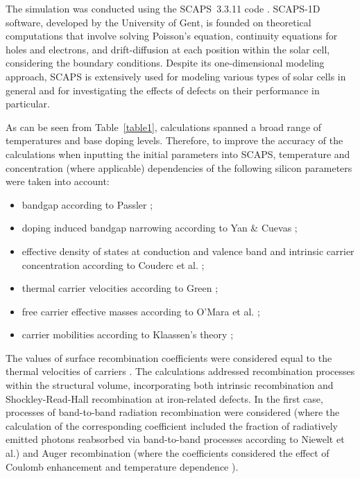 \documentclass[a4paper,fleqn]{cas-sc}
\begin{document}
The simulation was conducted using the SCAPS~3.3.11 code \cite{SCAPS1}.
SCAPS-1D software, developed by the University of Gent, is founded on theoretical computations that involve solving Poisson's equation,
continuity equations for holes and electrons, and drift-diffusion at each position within the solar cell,
considering the boundary conditions.
Despite its one-dimensional modeling approach, SCAPS is extensively used for modeling various types of solar cells \cite{Joshi2024,Ravidas2024,Liu2024,You2023} in general
and for investigating the effects of defects on their performance \cite{AitAbdelkadir2023,Liang2024,SCAPSDefect3} in particular.


As can be seen from Table~\ref{table1}, calculations spanned a broad range of temperatures and base doping levels.
Therefore, to improve the accuracy of the calculations when inputting the initial parameters into SCAPS,
temperature and concentration (where applicable) dependencies of the following silicon parameters were taken into account:

\begin{itemize}
    \item bandgap according to Passler \cite{Passler2002};
    \item doping induced bandgap narrowing according to Yan \& Cuevas \cite{EgNarrow};
    \item effective density of states at conduction and valence band and intrinsic carrier concentration according to Couderc et al. \cite{Si_ni_Couderc};
    \item thermal carrier velocities according to Green \cite{Nc:Green};
    \item free carrier effective masses according to O’Mara et al. \cite{OMara};
    \item carrier mobilities according to Klaassen's theory \cite{KLAASSEN953};
\end{itemize}

The values of surface recombination coefficients were considered equal to the thermal velocities of carriers \cite{Fell2015}.
The calculations addressed recombination processes within the structural volume,
incorporating both intrinsic recombination and Shockley-Read-Hall recombination at iron-related defects.
In the first case, processes of band-to-band radiation recombination were considered
(where the calculation of the corresponding coefficient included the fraction of radiatively emitted photons
reabsorbed via band-to-band processes according to Niewelt et al.\cite{Brad2022})
and Auger recombination (where the coefficients considered the effect of Coulomb enhancement \cite{AugerSi2022} and temperature dependence \cite{Si_Auger}).
\end{document}
